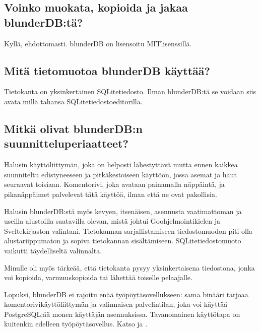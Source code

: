 \documentclass[letterpaper,10pt,finnish]{sphinxmanual}
\begin{document}
\subsection{Voinko muokata, kopioida ja jakaa blunderDB:tä?}
\label{\detokenize{faq:puis-je-modifier-copier-partager-blunderdb}}
\sphinxAtStartPar
Kyllä, ehdottomasti. blunderDB on lisensoitu MIT\sphinxhyphen{}lisenssillä.


\subsection{Mitä tietomuotoa blunderDB käyttää?}
\label{\detokenize{faq:quel-format-de-donnees-utilise-blunderdb}}
\sphinxAtStartPar
Tietokanta on yksinkertainen SQLite\sphinxhyphen{}tiedosto. Ilman blunderDB:tä se voidaan siis avata millä tahansa SQLite\sphinxhyphen{}tiedostoeditorilla.


\subsection{Mitkä olivat blunderDB:n suunnitteluperiaatteet?}
\label{\detokenize{faq:quelles-ont-ete-les-principes-de-conception-de-blunderdb}}
\sphinxAtStartPar
Halusin käyttöliittymän, joka on helposti lähestyttävä mutta ennen kaikkea suunniteltu edistyneeseen ja pitkäkestoiseen käyttöön, jossa asemat ja haut seuraavat toisiaan. Komentorivi, joka avataan painamalla \sphinxhyphen{}näppäintä, ja pikanäppäimet palvelevat tätä käyttöä, ilman että ne ovat pakollisia.

\sphinxAtStartPar
Halusin blunderDB:stä myös kevyen, itsenäisen, asennusta vaatimattoman ja useilla alustoilla saatavilla olevan, mistä johtui Go\sphinxhyphen{}ohjelmointikielen ja Svelte\sphinxhyphen{}kirjaston valintani. Tietokannan sarjallistamiseen tiedostomuodon piti olla alustariippumaton ja sopiva tietokannan sisältämiseen. SQLite\sphinxhyphen{}tiedostomuoto vaikutti täydelliseltä valinnalta.

\sphinxAtStartPar
Minulle oli myös tärkeää, että tietokanta pysyy yksinkertaisena tiedostona, jonka voi kopioida, varmuuskopioida tai lähettää toiselle pelaajalle.

\sphinxAtStartPar
Lopuksi, blunderDB ei rajoitu enää työpöytäsovellukseen: sama binääri tarjoaa komentorivikäyttöliittymän ja valinnaisen palvelintilan, joka voi käyttää PostgreSQL:ää monen käyttäjän asennuksissa. Tavanomainen käyttötapa on kuitenkin edelleen työpöytäsovellus. Katso {\hyperref[\detokenize{cli:cli}]{}} ja {\hyperref[\detokenize{mode_headless:headless}]{}}.
\end{document}

